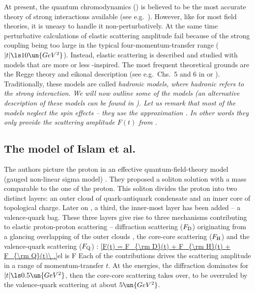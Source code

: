 At present, the quantum chromodynamics () is believed to be the most accurate theory of strong interactions available (see e.g.~). However, like for most field theories, it is uneasy to handle it non-perturbatively. At the same time perturbative calculations of elastic scattering amplitude fail because of the strong coupling being too large in the typical four-momentum-transfer range ($|t| \ls 10\un{GeV^2}$). Instead, elastic scattering is described and studied with models that are more or less -inspired. The most frequent theoretical grounds are the Regge theory and eikonal description (see e.g.~Chs.~5 and 6 in  or ). Traditionally, these models are called \em{hadronic models}, where hadronic refers to the strong interaction. We will now outline some of the models (an alternative description of these models can be found in ). Let us remark that most of the models neglect the spin effects -- they use the approximation . In other words they only provide the scattering amplitude $F(t)$ from .


\subsection{The model of Islam et al.}

The authors picture the proton in an effective quantum-field-theory model (gauged non-linear sigma model) . They proposed a soliton solution with a mass comparable to the one of the proton. This soliton divides the proton into two distinct layers: an outer cloud of quark-antiquark condensate and an inner core of topological charge. Later on , a third, the inner-most layer has been added -- a valence-quark bag. These three layers give rise to three mechanisms contributing to elastic proton-proton scattering -- diffraction scattering ($F_{\rm D}$) originating from a glancing overlapping of the outer clouds , the core-core scattering ($F_{\rm H}$)  and the valence-quark scattering ($F_{\rm Q}$) :
\eqref{F(t) = F_{\rm D}(t) + F_{\rm H}(t) + F_{\rm Q}(t)\ .}{el is F}
Each of the contributions drives the scattering amplitude in a range of momentum-transfer $t$. At the  energies, the diffraction dominates for $|t| \ls 0.5\un{GeV^2}$, then the core-core scattering takes over, to be overruled by the valence-quark scattering at about $5\un{GeV^2}$.

